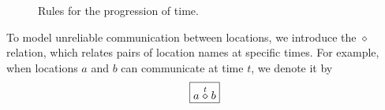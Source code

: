 \begin{figure}[!h]
\caption{Rules for the progression of time.}\label{fig:rule:progress}
\end{figure}


To model unreliable communication between locations, we introduce the
$\diamond$ relation, which relates pairs of location names at specific times.
For example, when locations $a$ and $b$ can
communicate at time $t$, we denote it by
\begin{equation*}
 \boxed{a \stackrel{t}{\diamond} b}
\end{equation*}

